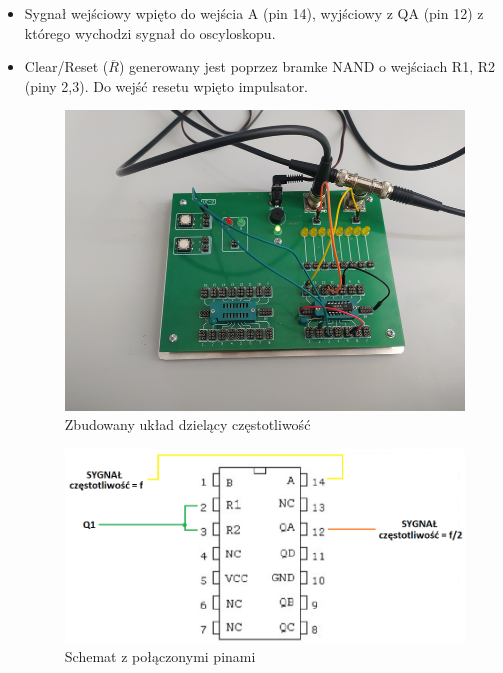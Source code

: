 \begin{itemize}
    \item Sygnał wejściowy wpięto do wejścia A (pin 14), wyjściowy z QA (pin 12) z którego wychodzi sygnał do oscyloskopu.
    \item Clear/Reset ($\overline{R}$) generowany jest poprzez bramke NAND o wejściach R1, R2 (piny 2,3). Do wejść resetu wpięto impulsator.
        \begin{figure}[H]
            \centering
            \includegraphics[width=\textwidth]{img/dzielenie/1653500524827_scaled.png}
            \caption{Zbudowany układ dzielący częstotliwość}
            \label{JK_dzielenie:zbudowany_uklad}
        \end{figure}
        
        \begin{figure}[H]
            \centering
            \includegraphics[width=\textwidth]{img/schemes_w_pins/dzielenie_w_pins.png}
            \caption{Schemat z połączonymi pinami}
            \label{JK_dzielenie:schemat_z_pinami}
        \end{figure}
\end{itemize}

